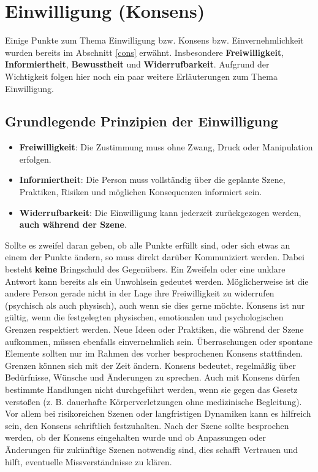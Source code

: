 \documentclass[a4paper,12pt]{article}
\begin{document}

\newpage
\section{Einwilligung (Konsens)}
Einige Punkte zum Thema Einwilligung bzw. Konsens bzw. Einvernehmlichkeit wurden bereits im Abschnitt \ref{cons} erwähnt. Insbesondere \textbf{Freiwilligkeit}, \textbf{Informiertheit}, \textbf{Bewusstheit} und \textbf{Widerrufbarkeit}. Aufgrund der Wichtigkeit folgen hier noch ein paar weitere Erläuterungen zum Thema Einwilligung.

\subsection{Grundlegende Prinzipien der Einwilligung}
\begin{itemize}
	\item \textbf{Freiwilligkeit}: Die Zustimmung muss ohne Zwang, Druck oder Manipulation erfolgen.
	\item \textbf{Informiertheit}: Die Person muss vollständig über die geplante Szene, Praktiken, Risiken und möglichen Konsequenzen informiert sein.
	\item \textbf{Widerrufbarkeit}: Die Einwilligung kann jederzeit zurückgezogen werden, \textbf{auch während der Szene}.
\end{itemize}

Sollte es zweifel daran geben, ob alle Punkte erfüllt sind, oder sich etwas an einem der Punkte ändern, so muss direkt darüber Kommuniziert werden. Dabei besteht \textbf{keine} Bringschuld des Gegenübers. Ein Zweifeln oder eine unklare Antwort kann bereits als ein Unwohlsein gedeutet werden. Möglicherweise ist die andere Person gerade nicht in der Lage ihre Freiwilligkeit zu widerrufen (psychisch als auch physisch), auch wenn sie dies gerne möchte. Konsens ist nur gültig, wenn die festgelegten physischen, emotionalen und psychologischen Grenzen respektiert werden. Neue Ideen oder Praktiken, die während der Szene aufkommen, müssen ebenfalls einvernehmlich sein. Überraschungen oder spontane Elemente sollten nur im Rahmen des vorher besprochenen Konsens stattfinden. Grenzen können sich mit der Zeit ändern. Konsens bedeutet, regelmäßig über Bedürfnisse, Wünsche und Änderungen zu sprechen. Auch mit Konsens dürfen bestimmte Handlungen nicht durchgeführt werden, wenn sie gegen das Gesetz verstoßen (z. B. dauerhafte Körperverletzungen ohne medizinische Begleitung). Vor allem bei risikoreichen Szenen oder langfristigen Dynamiken kann es hilfreich sein, den Konsens schriftlich festzuhalten. Nach der Szene sollte besprochen werden, ob der Konsens eingehalten wurde und ob Anpassungen oder Änderungen für zukünftige Szenen notwendig sind, dies schafft Vertrauen und hilft, eventuelle Missverständnisse zu klären.
\end{document}
